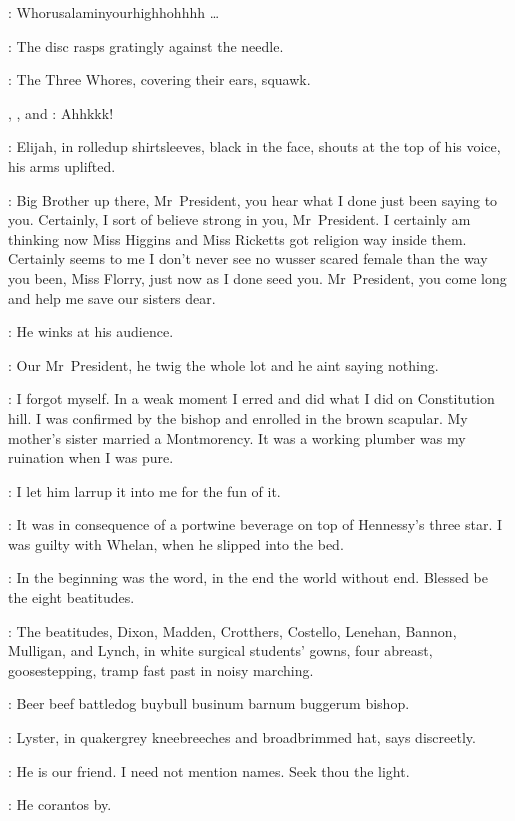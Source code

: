 \Gramophone:
Whorusalaminyourhighhohhhh \ldots

:
The disc rasps gratingly against the needle.

:
The Three Whores, covering their ears, squawk.

\Zoe, \Kitty, and \Florry:
Ahhkkk!

:
Elijah, in rolledup shirtsleeves, black in the face,
shouts at the top of his voice, his arms uplifted.

\Elijah:
Big Brother up there, Mr~President,
you hear what I done just been saying to you.
Certainly, I sort of believe strong in you, Mr~President.
I certainly am thinking now
Miss Higgins and Miss Ricketts got religion way inside them.
Certainly seems to me I don't never see no wusser scared female
than the way you been, Miss Florry, just now as I done seed you.
Mr~President, you come long and help me save our sisters dear.

:
He winks at his audience.

\Elijah:
Our Mr~President, he twig the whole lot and he aint saying nothing.

\KittyKate[2]:
I forgot myself.
In a weak moment I erred and did what I did on Constitution hill.
I was confirmed by the bishop and enrolled in the brown scapular.
My mother's sister married a Montmorency.
It was a working plumber was my ruination when I was pure.

\ZoeFanny[2]:
I let him larrup it into me for the fun of it.

\FlorryTeresa[2]:
It was in consequence of a portwine beverage on top of Hennessy's three star.
I was guilty with Whelan, when he slipped into the bed.

\Stephen[1]:
In the beginning was the word, in the end the world without end.
Blessed be the eight beatitudes.

:
The beatitudes, Dixon, Madden, Crotthers, Costello, Lenehan, Bannon,
Mulligan, and Lynch, in white surgical students' gowns, four abreast,
goosestepping, tramp fast past in noisy marching.

\Beatitudes:
Beer beef battledog buybull businum barnum buggerum bishop.

:
Lyster, in quakergrey kneebreeches and broadbrimmed hat, says discreetly.

\Lyster:
He is our friend.
I need not mention names.
Seek thou the light.

:
He corantos by.

